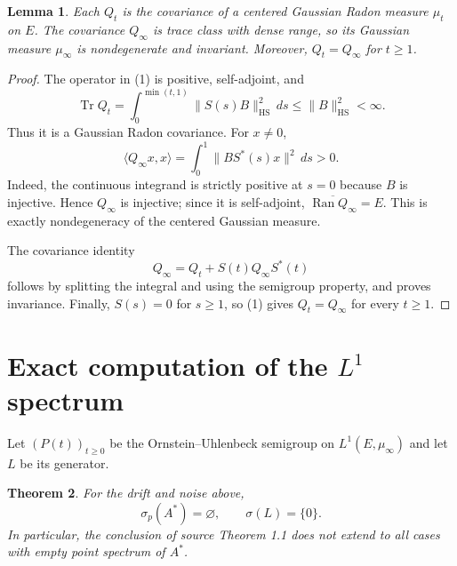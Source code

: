 \documentclass[11pt]{article}
\newtheorem{theorem}{Theorem}
\newtheorem{lemma}[theorem]{Lemma}
\newcommand{\Ran}{\operatorname{Ran}}
\newcommand{\spec}{\sigma}
\begin{document}
\begin{lemma}\label{lem:gaussian}
Each $Q_t$ is the covariance of a centered Gaussian Radon measure $\mu_t$ on
$E$.  The covariance $Q_\infty$ is trace class with dense range, so its
Gaussian measure $\mu_\infty$ is nondegenerate and invariant.  Moreover,
$Q_t=Q_\infty$ for $t\geq1$.
\end{lemma}

\begin{proof}
The operator in (1) is positive, self-adjoint, and
\[
 \operatorname{Tr}Q_t
 =\int_0^{\min(t,1)}\|S(s)B\|_{\mathrm{HS}}^2\,ds
 \leq \|B\|_{\mathrm{HS}}^2<\infty.
\]
Thus it is a Gaussian Radon covariance.  For $x\neq0$,
\[
 \langle Q_\infty x,x\rangle
 =\int_0^1\|B S^*(s)x\|^2\,ds>0.
\]
Indeed, the continuous integrand is strictly positive at $s=0$ because $B$
is injective.  Hence $Q_\infty$ is injective; since it is self-adjoint,
$\overline{\Ran Q_\infty}=E$.  This is exactly nondegeneracy of the centered
Gaussian measure.

The covariance identity
\[
 Q_\infty=Q_t+S(t)Q_\infty S^*(t)
\]
follows by splitting the integral and using the semigroup property, and proves
invariance.  Finally, $S(s)=0$ for $s\geq1$, so (1) gives
$Q_t=Q_\infty$ for every $t\geq1$.
\end{proof}

\section{Exact computation of the \texorpdfstring{$L^1$}{L1} spectrum}

Let $(P(t))_{t\geq0}$ be the Ornstein--Uhlenbeck semigroup on
$L^1(E,\mu_\infty)$ and let $L$ be its generator.

\begin{theorem}\label{thm:counterexample}
For the drift and noise above,
\[
 \spec_p(A^*)=\varnothing,
 \qquad
 \spec(L)=\{0\}.
\]
In particular, the conclusion of source Theorem 1.1 does not extend to all
cases with empty point spectrum of $A^*$.
\end{theorem}
\end{document}
